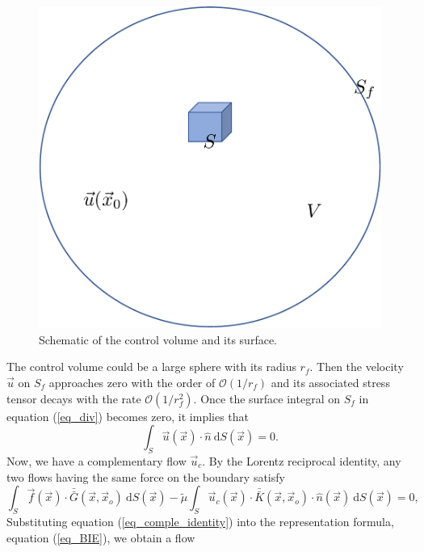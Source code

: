 \begin{figure}[h]
	\begin{center}
		\includegraphics[scale=0.4]{./figures/fig_dlp_volume}
		\vspace{0.5cm}
	\caption{Schematic of the control volume and its surface.}
	\label{fig_dlp_volume}
\end{center}
\end{figure}
The control volume could be a large sphere with its radius $r_f$. Then the velocity $\vec{u}$ on $S_f$ approaches zero with the order of $\mathcal{O}(1/r_f)$ and its associated stress tensor decays with the rate $\mathcal{O} (1/r_f^2)$. Once the surface integral on $S_f$ in equation (\ref{eq_div}) becomes zero, it implies that
\[
\int_{S} \vec{u}(\vec{x}) \cdot \hat{n} \ \text{d}S(\vec{x}) = 0.
\]
Now, we have a complementary flow $\vec{u}_c$.  By the Lorentz reciprocal identity, any two flows having the same force on the boundary satisfy
\begin{equation}
	\int_{S}  \vec{f}(\vec{x}) \cdot \bar{\bar{G}}(\vec{x},\vec{x}_o) \ \text{d}S(\vec{x})  
	- \tilde{\mu} \int_S
	  \vec{u}_c(\vec{x}) \cdot  \bar{\bar{K}}(\vec{x},\vec{x}_o) 
	  \cdot \hat{n} ( \vec{x})
	  \ \text{d}S(\vec{x})
	  =0,
	  \label{eq_comple_identity}
\end{equation}
Substituting equation (\ref{eq_comple_identity}) into the representation formula, equation (\ref{eq_BIE}), we obtain a flow
